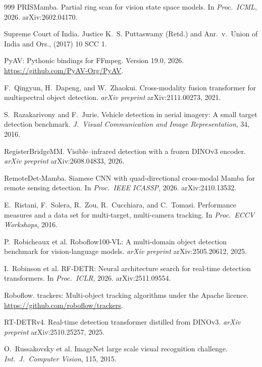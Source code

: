 \begin{thebibliography}{999}
PRISMamba. Partial ring scan for vision state space models.
In \textit{Proc.\ ICML}, 2026. arXiv:2602.04170.

Supreme Court of India.
Justice K.~S. Puttaswamy (Retd.) and Anr.\ v.\ Union of India and Ors.,
(2017) 10 SCC 1.

PyAV: Pythonic bindings for FFmpeg. Version 19.0, 2026.
\url{https://github.com/PyAV-Org/PyAV}.

F.~Qingyun, H.~Dapeng, and W.~Zhaokui.
Cross-modality fusion transformer for multispectral object detection.
\textit{arXiv preprint} arXiv:2111.00273, 2021.

S.~Razakarivony and F.~Jurie.
Vehicle detection in aerial imagery: A small target detection benchmark.
\textit{J.\ Visual Communication and Image Representation}, 34, 2016.

RegisterBridgeMM. Visible--infrared detection with a frozen DINOv3 encoder.
\textit{arXiv preprint} arXiv:2608.04833, 2026.

RemoteDet-Mamba. Siamese CNN with quad-directional cross-modal Mamba for
remote sensing detection. In \textit{Proc.\ IEEE ICASSP}, 2026.
arXiv:2410.13532.

E.~Ristani, F.~Solera, R.~Zou, R.~Cucchiara, and C.~Tomasi.
Performance measures and a data set for multi-target, multi-camera tracking.
In \textit{Proc.\ ECCV Workshops}, 2016.

P.~Robicheaux et al.
Roboflow100-VL: A multi-domain object detection benchmark for vision-language
models. \textit{arXiv preprint} arXiv:2505.20612, 2025.

I.~Robinson et al.
RF-DETR: Neural architecture search for real-time detection transformers.
In \textit{Proc.\ ICLR}, 2026. arXiv:2511.09554.

Roboflow.
trackers: Multi-object tracking algorithms under the Apache licence.
\url{https://github.com/roboflow/trackers}.

RT-DETRv4. Real-time detection transformer distilled from DINOv3.
\textit{arXiv preprint} arXiv:2510.25257, 2025.

O.~Russakovsky et al.
ImageNet large scale visual recognition challenge.
\textit{Int.\ J.\ Computer Vision}, 115, 2015.


\end{thebibliography}
